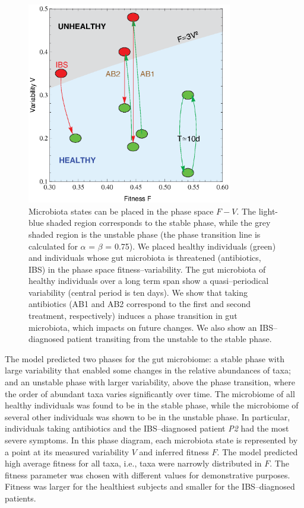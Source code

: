 \begin{figure}
	\centering
	\vspace*{-5mm} %
	\includegraphics[width=0.8\textwidth]{figs/Fig3.eps}
	\caption{Microbiota states can be placed in the phase space $F-V$. The light-blue shaded region corresponds to the stable phase, while the grey shaded region is the unstable phase (the phase transition line is calculated for  $\alpha$ = $\beta$ = 0.75). We placed healthy individuals (green) and individuals whose gut microbiota is threatened (antibiotics, IBS) in the phase space fitness--variability. The gut microbiota of healthy individuals over a long term span show a quasi--periodical variability (central period is ten days). We show that taking antibiotics (AB1 and AB2 correspond to the first and second treatment, respectively) induces a phase transition in gut microbiota, which impacts on future changes. We also show an IBS--diagnosed patient transiting from the unstable to the stable phase.}
	\label{fig:main3}
\end{figure}

The model predicted two phases for the gut microbiome: a stable phase with large variability that enabled some changes in the relative abundances of taxa; and an unstable phase with larger variability, above the phase transition, where the order of abundant taxa varies significantly over time. The microbiome of all healthy individuals was found to be in the stable phase, while the microbiome of several other individuals was shown to be in the unstable phase. In particular, individuals taking antibiotics and the IBS--diagnosed patient \emph{P2} had the most severe symptoms. In this phase diagram, each microbiota state is represented by a point at its measured variability $V$ and inferred fitness $F$. The model predicted high average fitness for all taxa, i.e., taxa were narrowly distributed in $F$. The fitness parameter was chosen with different values for demonstrative purposes. Fitness was larger for the healthiest subjects and smaller for the IBS--diagnosed patients.

